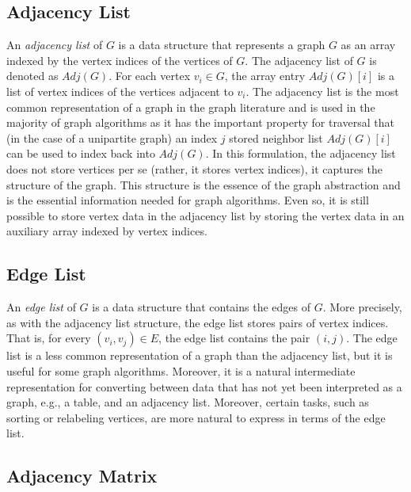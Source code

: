 \subsection{Adjacency List}

An \emph{adjacency list} of $G$ is a data structure that represents a graph $G$ as an array
indexed by the vertex indices of the vertices of $G$.
The adjacency list of $G$ is denoted as $Adj(G)$.
For each vertex $v_i \in G$, the array entry $Adj(G)[i]$ is a list of
vertex indices of the vertices adjacent to $v_i$.
The adjacency list is the most common representation of a graph in the graph literature
and is used in the majority of graph algorithms as it has the important
property for traversal that (in the case of a unipartite graph)
an index $j$ stored neighbor list $Adj(G)[i]$ can
be used to index back into $Adj(G)$. In this formulation, the adjacency list
does not store vertices per se (rather, it stores vertex indices), it captures the
structure of the graph. This structure is the essence of the graph abstraction and
is the essential information needed for graph algorithms.
Even so, it is still possible to store vertex data in the adjacency list by storing
the vertex data in an auxiliary array indexed by vertex indices.

\subsection{Edge List}

An \emph{edge list} of $G$ is a data structure that contains the edges of $G$. More precisely, as
with the adjacency list structure, the edge list stores pairs of vertex indices. That is, for
every $(v_i, v_j) \in E$, the edge list contains the pair $(i, j)$. The edge list is
a less common representation of a graph than the adjacency list, but it is useful for
some graph algorithms. Moreover, it is a natural intermediate representation for
converting between data that has not yet been interpreted as a graph, e.g., a table,
and an adjacency list. Moreover, certain tasks, such as sorting or relabeling vertices, are
more natural to express in terms of the edge list.

\subsection{Adjacency Matrix}




